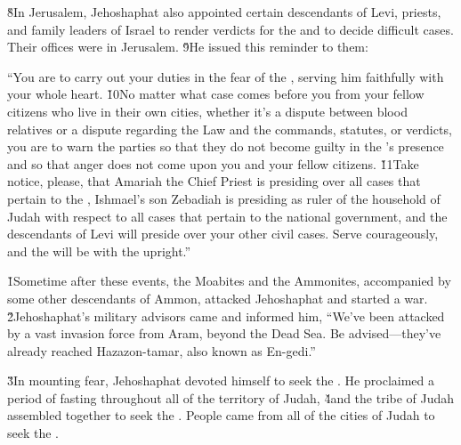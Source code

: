 \v{8}In Jerusalem, Jehoshaphat also appointed certain descendants of Levi, priests, and family leaders of Israel to render verdicts for the  and to decide difficult cases. Their offices were in Jerusalem. \v{9}He issued this reminder to them:

\begin{poetry}
\poeml ``You are to carry out your duties in the fear of the , serving him faithfully with your whole heart. \v{10}No matter what case comes before you from your fellow citizens who live in their own cities, whether it's a dispute between blood relatives or a dispute regarding the Law and the commands, statutes, or verdicts, you are to warn the parties so that they do not become guilty in the 's presence and so that anger does not come upon you and your fellow citizens. \v{11}Take notice, please, that Amariah the Chief Priest is presiding over all cases that pertain to the , Ishmael's son Zebadiah is presiding as ruler of the household of Judah with respect to all cases that pertain to the national government, and the descendants of Levi will preside over your other civil cases. Serve courageously, and the  will be with the upright.''
\end{poetry}

\v{1}Sometime after these events, the Moabites and the Ammonites, accompanied by some other descendants of Ammon, attacked Jehoshaphat and started a war. \v{2}Jehoshaphat's military advisors came and informed him, ``We've been attacked by a vast invasion force from Aram, beyond the Dead Sea. Be advised---they've already reached Hazazon-tamar, also known as En-gedi.''

\v{3}In mounting fear, Jehoshaphat devoted himself to seek the . He proclaimed a period of fasting throughout all of the territory of Judah, \v{4}and the tribe of Judah assembled together to seek the . People came from all of the cities of Judah to seek the .

